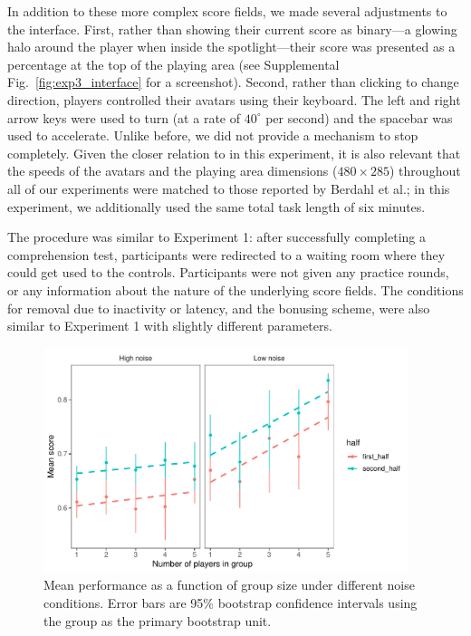 \documentclass[12pt,letterpaper]{article}
\begin{document}
In addition to these more complex score fields, we made several adjustments to the interface.
First, rather than showing their current score as binary---a glowing halo around the player when inside the spotlight---their score was presented as a percentage at the top of the playing area (see Supplemental Fig.~\ref{fig:exp3_interface} for a screenshot).
Second, rather than clicking to change direction, players controlled their avatars using their keyboard. 
The left and right arrow keys were used to turn (at a rate of $40^\circ$ per second) and the
spacebar was used to accelerate. 
Unlike before, we did not provide a mechanism to stop completely.  
Given the closer relation to  in this experiment, it is also relevant that the speeds of the avatars and the playing area dimensions ($480 \times 285$) throughout all of our experiments were matched to those reported by Berdahl et al.; in this experiment, we additionally used the same total task length of six minutes.

The procedure was similar to Experiment 1: after successfully completing a comprehension test,  participants were redirected to a waiting room where they could get used to the controls.  
Participants were not given any practice rounds, or any information about the nature of the underlying score fields.
The conditions for removal due to inactivity or latency, and the bonusing scheme, were also similar to Experiment 1 with slightly different parameters.

\begin{figure}[t!]
  \centering
  \includegraphics[width=0.95\textwidth]{./figures/performance-summary}
  \caption{Mean performance as a function of group size under different noise conditions.  Error bars are 95\% bootstrap confidence intervals using the group as the primary bootstrap unit.}
  \label{fig:performance}
\end{figure}
\end{document}
